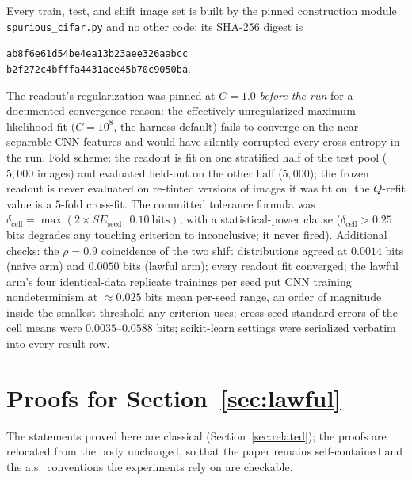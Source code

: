 \documentclass[twocolumn,10pt]{article}
\theoremstyle{definition}
\theoremstyle{remark}
\begin{document}
Every train, test, and shift image set is built by the pinned
construction module \texttt{spurious\_cifar.py} and no other code;
its SHA-256 digest is
\begin{center}
\texttt{ab8f6e61d54be4ea13b23aee326aabcc}\\
\texttt{b2f272c4bfffa4431ace45b70c9050ba}.
\end{center}
The
readout's regularization was pinned at $C = 1.0$ \emph{before the run}
for a documented convergence reason: the effectively unregularized
maximum-likelihood fit ($C = 10^8$, the harness default) fails to
converge on the near-separable CNN features and would have silently
corrupted every cross-entropy in the run. Fold scheme: the readout is
fit on one stratified half of the test pool ($5{,}000$ images) and
evaluated held-out on the other half ($5{,}000$); the frozen readout
is never evaluated on re-tinted versions of images it was fit on; the
$Q$-refit value is a $5$-fold cross-fit. The committed tolerance
formula was $\delta_{\mathrm{cell}} = \max(2 \times
SE_{\mathrm{seed}},\ 0.10\ \text{bits})$, with a statistical-power
clause ($\delta_{\mathrm{cell}} > 0.25$ bits degrades any touching
criterion to inconclusive; it never fired). Additional checks: the
$\rho = 0.9$ coincidence of the two shift distributions agreed at
$0.0014$ bits (naive arm) and $0.0050$ bits (lawful arm); every
readout fit converged; the lawful arm's four identical-data replicate
trainings per seed put CNN training nondeterminism at $\approx 0.025$
bits mean per-seed range, an order of magnitude inside the smallest
threshold any criterion uses; cross-seed standard errors of the cell
means were $0.0035$--$0.0588$ bits; scikit-learn settings were
serialized verbatim into every result row.

\section{Proofs for Section~\ref{sec:lawful}}
\label{app:proofs-s3}

The statements proved here are classical
(Section~\ref{sec:related}); the proofs are relocated from the body
unchanged, so that the paper remains self-contained and the a.s.\
conventions the experiments rely on are checkable.
\end{document}

